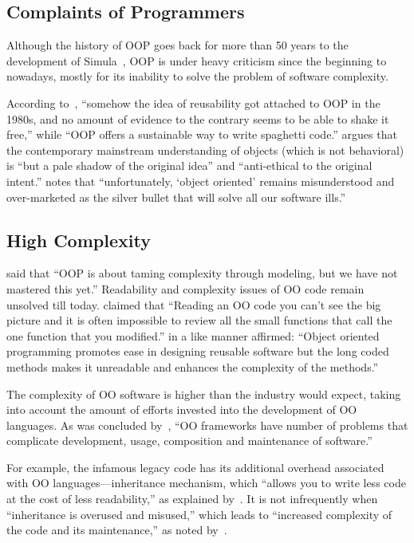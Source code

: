 \subsection{Complaints of Programmers}

Although the history of OOP goes back for more than
50 years to the development of Simula~\citep{dahl1966simula}, OOP is under heavy
criticism since the beginning to nowadays, mostly for its inability
to solve the problem of software complexity.

According to~\citet{graham2004hackers}, ``somehow the idea of reusability
got attached to OOP in the 1980s, and no amount of evidence to the contrary
seems to be able to shake it free,'' while
``OOP offers a sustainable way to write spaghetti code.''
\citet{west2004object} argues that the contemporary mainstream understanding
of objects (which is not behavioral) is ``but a pale shadow of the original idea'' and
``anti-ethical to the original intent.''
\citet{gosling1995java} notes that
``unfortunately, `object oriented' remains misunderstood and
over-marketed as the silver bullet that will solve all our software ills.''

\subsection{High Complexity}

\citet{nierstrasz2010ten} said that ``OOP is about taming
complexity through modeling, but we have not mastered this yet.''
Readability and complexity issues of OO code remain unsolved till
today. \citet{shelly2015flaws} claimed that ``Reading an OO
code you can't see the big picture and it is often impossible to review all the
small functions that call the one function that you modified.''
\citet{khanam2018} in a like manner affirmed: ``Object oriented programming
promotes ease in designing reusable software but the long coded methods makes
it unreadable and enhances the complexity of the methods.''

The complexity of OO software is higher than the industry would expect, taking
into account the amount of efforts invested into the development of
OO languages. As was concluded by~\citet{bosch1997object}, ``OO frameworks have
number of problems that complicate development, usage, composition and
maintenance of software.''

For example, the infamous legacy code has its additional overhead associated with OO
languages---inheritance mechanism, which ``allows you to write less code
at the cost of less readability,'' as explained by~\citet{carter1997oopvsr}.
It is not infrequently when ``inheritance is overused and misused,''
which leads to ``increased complexity of the code and its maintenance,''
as noted by~\citet{bernstein2016legacy}.

